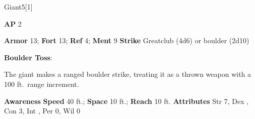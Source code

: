 \begin{monsection}[Hill]{Giant}{5}[1]
\vspace{-1em}\vspace{-1em}
\begin{spellcontent}
\begin{spelltargetinginfo}
{\textbf{AP} 2}

\pari \textbf{Armor} 13;
\textbf{Fort} 13;
\textbf{Ref} 4;
\textbf{Ment} 9
\pari \textbf{Strike} Greatclub  (4d6) or boulder  (2d10)



\end{spelltargetinginfo}


\begin{spelleffects}

\pari
\textbf{Boulder Toss}:

The giant makes a ranged boulder strike, treating it as a thrown weapon with a 100 ft.\ range increment.




\end{spelleffects}

\end{spellcontent}

\begin{monsterfooter}
\pari \textbf{Awareness} 
\pari \textbf{Speed} 40 ft.;
\textbf{Space} 10 ft.;
\textbf{Reach} 10 ft.
\pari \textbf{Attributes}
Str 7,
Dex ,
Con 3,
Int ,
Per 0,
Wil 0
\end{monsterfooter}
\end{monsection}



